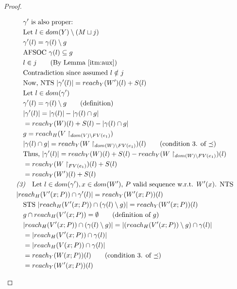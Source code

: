 \documentclass{easychair}
\theoremstyle{definition}
\begin{document}
\begin{proof}
\begin{description}
\begin{align*}
		&\quad \gamma' \text{ is also proper: }\\
		&\quad \text{Let } l \in dom(Y) \setminus (M \sqcup j)\\
		&\quad \gamma'(l) = \gamma(l) \setminus g\\
		&\quad \text{AFSOC } \gamma(l) \subseteq g\\ 
		&\quad l \in j \tag{By Lemma \ref{itm:aux}}\\
		&\quad \text{Contradiction since assumed } l \notin j\\ 
		&\quad \text{Now, NTS } |\gamma'(l)| = reach_{Y}(W')(l) + S(l)\\
		&\quad \text{Let } l \in dom(\gamma')\\
		&\quad \gamma'(l) = \gamma(l) \setminus g \tag{definition}\\ 
		&\quad |\gamma'(l)| = |\gamma(l)| - |\gamma(l) \cap g|\\
		&\quad = reach_Y(W)(l) + S(l) - |\gamma(l) \cap g|\\
		&\quad g = reach_H(V\restriction_{dom(V) \setminus FV(e_1)})\\
		&\quad |\gamma(l) \cap g| = reach_Y(W\restriction_{dom(W)\setminus FV(e_1)})(l) 
			\tag{condition 3. of $\preceq$}\\
		&\quad \text{Thus, } |\gamma'(l)| = 
			reach_Y(W)(l) + S(l) - reach_Y(W\restriction_{dom(W)\setminus FV(e_1)})(l)\\
		&\quad = reach_Y(W\restriction_{FV(e_1)})(l) +  S(l)\\
		&\quad = reach_Y(W')(l) +  S(l)\\
		&\emph{(3)}\quad \text{Let $l \in dom(\gamma'), x \in dom(W')$, 
			$P$ valid sequence w.r.t. $W'(x)$. NTS }\\ 
		&|reach_{H}(V'(x;P)) \cap \gamma'(l)| = reach_{Y}(W'(x;P))(l)\\ 
		&\quad \text{STS } |reach_{H}(V'(x;P)) \cap (\gamma(l) \setminus g)| = reach_{Y}(W'(x;P))(l) \\
		&\quad g \cap reach_H(V'(x;P)) = \emptyset \tag{definition of $g$}\\
		&\quad |reach_{H}(V'(x;P)) \cap (\gamma(l) \setminus g)| = 
				|(reach_{H}(V'(x;P)) \setminus g) \cap \gamma(l)|\\
		&\quad = |reach_{H}(V'(x;P)) \cap \gamma(l)|\\
		&\quad = |reach_{H}(V(x;P)) \cap \gamma(l)|\\
		&\quad = reach_{Y}(W(x;P))(l) \tag{condition 3. of $\preceq$}\\
		&\quad = reach_{Y}(W'(x;P))(l) \\

\end{align*}
\end{description}
\end{proof}
\end{document}
